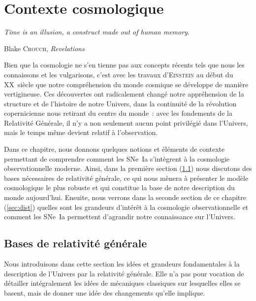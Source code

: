 \documentclass[../main/main.tex]{subfiles}
\begin{document}
\mainmatter


\chapter{Contexte cosmologique}\label{ch:cosmo}

\epigraph{\openquote\textit{Time is an illusion, a construct made out of human
memory.}\closequote}{Blake \textsc{Crouch}, \textit{Revelations}}

Bien que la cosmologie ne s'en tienne pas aux concepts récents tels que nous les
connaissons et les vulgarisons, c'est avec les travaux d'\textsc{Einstein} au
début du XX\ieme~siècle que notre compréhension du monde cosmique se développe
de manière vertigineuse. Ces découvertes ont radicalement changé notre
appréhension de la structure et de l'histoire de notre Univers, dans la
continuité de la révolution copernicienne nous retirant du centre du monde~:
avec les fondements de la Relativité Générale, il n'y a non seulement aucun
point privilégié dans l'Univers, mais le temps même devient relatif à
l'observation.

Dans ce chapitre, nous donnons quelques notions et éléments de contexte
permettant de comprendre comment les SNe~Ia s'intègrent à la cosmologie
observationnelle moderne. Ainsi, dans la première section (\ref{sec:bases}) nous
discutons des bases nécessaires de relativité générale, ce qui nous mènera à
présenter le modèle cosmologique le plus robuste et qui constitue la base de
notre description du monde aujourd'hui. Ensuite, nous verrons dans la seconde
section de ce chapitre (\ref{sec:dist}) quelles sont les grandeurs d'intérêt à
la cosmologie observationnelle et comment les SNe~Ia permettent d'agrandir notre
connaissance sur l'Univers.

\vfill
\minitoc
\vfill

\newpage

\section{Bases de relativité générale}\label{sec:bases}

Nous introduisons dans cette section les idées et grandeurs fondamentales à la
description de l'Univers par la relativité générale. Elle n'a pas pour vocation
de détailler intégralement les idées de mécaniques classiques sur lesquelles
elles se basent, mais de donner une idée des changements qu'elle implique.
\end{document}
